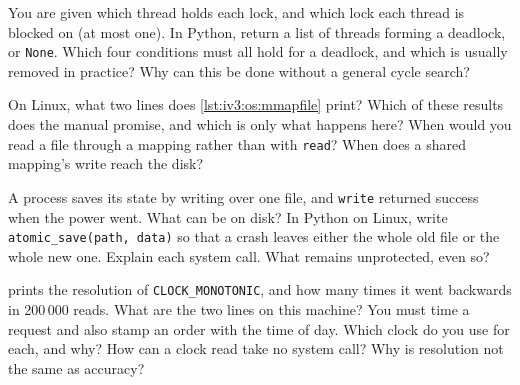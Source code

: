 \begin{question}\label{iq:iv3:operating-systems-concurrency-and-networks:16}
You are given which thread holds each lock, and which lock each thread is blocked on (at most one). In Python, return a list of threads forming a deadlock, or \texttt{None}. Which four conditions must all hold for a deadlock, and which is usually removed in practice? Why can this be done without a general cycle search?
\end{question}

\begin{question}\label{iq:iv3:operating-systems-concurrency-and-networks:17}
On Linux, what two lines does \cref{lst:iv3:os:mmapfile} print? Which of these results does the manual promise, and which is only what happens here? When would you read a file through a mapping rather than with \texttt{read}? When does a shared mapping's write reach the disk?
\label{lst:iv3:os:mmapfile}
\end{question}

\begin{question}\label{iq:iv3:operating-systems-concurrency-and-networks:18}
A process saves its state by writing over one file, and \texttt{write} returned success when the power went. What can be on disk? In Python on Linux, write \texttt{atomic\_save(path, data)} so that a crash leaves either the whole old file or the whole new one. Explain each system call. What remains unprotected, even so?
\end{question}

\begin{question}\label{iq:iv3:operating-systems-concurrency-and-networks:19}
 prints the resolution of \texttt{CLOCK\_MONOTONIC}, and how many times it went backwards in 200\,000 reads. What are the two lines on this machine? You must time a request and also stamp an order with the time of day. Which clock do you use for each, and why? How can a clock read take no system call? Why is resolution not the same as accuracy?
\label{lst:iv3:os:clocks}
\end{question}


